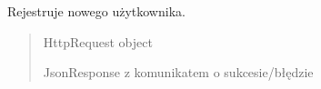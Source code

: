 \documentclass[letterpaper,11pt,polish]{sphinxmanual}
\begin{document}

\begin{fulllineitems}
\label{\detokenize{mainApp:mainApp.views.register_view}}
\pysigstartsignatures
{}
\pysigstopsignatures
\sphinxAtStartPar
Rejestruje nowego użytkownika.
\begin{quote}\begin{description}
\sphinxAtStartPar
{} \textendash{} HttpRequest object

\sphinxAtStartPar
JsonResponse z komunikatem o sukcesie/błędzie

\end{description}\end{quote}

\end{fulllineitems}
\end{document}
